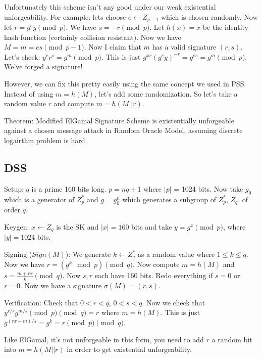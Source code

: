 \documentclass[psamsfonts]{amsart}
\begin{document}
Unfortunately this scheme isn't any good under our weak existential unforgeability. For example: lets choose $e \leftarrow Z_{p-1}$ which is chosen randomly. Now let $r = g^e y \pmod{p}$. We have $s = -r \pmod{p}$. Let $h(x) =x $ be the identity hash function (certainly collision resistant). Now we have $M = m = es \pmod {p-1}$. Now I claim that $m$ has a valid signature $(r,s)$. Let's check: $y^r r^s = g^m \pmod{p}$. This is just $g^{xr} (g^e y)^{-r} = g^{es} = g^m \pmod{p}$. We've forged a signature!

However, we can fix this pretty easily using the same concept we used in PSS. Instead of using $m = h(M)$, let's add some randomization. So let's take a random value $r$ and compute $m = h(M || r)$.

Theorem: Modified ElGamal Signature Scheme is existentially unforgeable against a chosen message attack in Random Oracle Model, assuming discrete logairthm problem is hard.

\subsection{DSS}

Setup: $q$ is a prime 160 bits long. $p = nq + 1$ where $|p|$ = 1024 bits. Now take $g_0$ which is a generator of $Z_p^*$ and $g = g_0^n$ which generates a subgroup of $Z_p^*$, $Z_q$, of order $q$.

Keygen: $x \leftarrow Z_q$ is the SK and $|x| = 160$ bits and take $y = g^x \pmod{p}$, where $|y| = 1024$ bits.

Signing ($Sign(M)$): We generate $k \leftarrow Z_q^*$ as a random value where $1 \leq k \leq q$. Now we have $r = (g^k \mod{p}) \pmod{q}$. Now compute $m = h(M)$ and $s = \frac{m + rx}{k} \pmod{q}$. Now $s, r$ each have 160 bits. Redo everything if $s = 0$ or $r = 0$. Now we have a signature $\sigma(M) = (r,s)$. 

Verification: Check that $0 < r < q$, $0 < s < q$. Now we check that $y^{r/s} g^{m/s} \pmod{p} \pmod{q} = r$ where $m = h(M)$. This is just $g^{(rx + m)/s} = g^k = r \pmod{p} \pmod{q}$. 

Like ElGamal, it's not unforgeable in this form, you need to add $r$ a random bit into $m = h(M || r)$ in order to get existential unforgeability.
\end{document}
